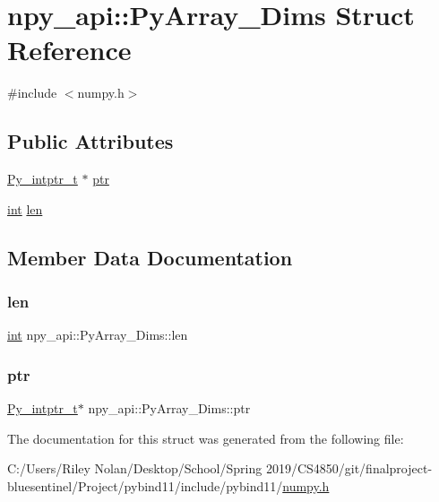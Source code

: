 \hypertarget{structnpy__api_1_1_py_array___dims}{}\section{npy\+\_\+api\+::Py\+Array\+\_\+\+Dims Struct Reference}
\label{structnpy__api_1_1_py_array___dims}


{\ttfamily \#include $<$numpy.\+h$>$}

\subsection*{Public Attributes}
\begin{DoxyCompactItemize}
\item 
\mbox{\hyperlink{pyport_8h_abd3f9942a9af5f7423b51d51992df0ac}{Py\+\_\+intptr\+\_\+t}} $\ast$ \mbox{\hyperlink{structnpy__api_1_1_py_array___dims_a92da178f75f6195573be943e4ae19aba}{ptr}}
\item 
\mbox{\hyperlink{warnings_8h_a74f207b5aa4ba51c3a2ad59b219a423b}{int}} \mbox{\hyperlink{structnpy__api_1_1_py_array___dims_a5ac8498e3a21e91b70c1e4740247e7ff}{len}}
\end{DoxyCompactItemize}


\subsection{Member Data Documentation}
\mbox{\label{structnpy__api_1_1_py_array___dims_a5ac8498e3a21e91b70c1e4740247e7ff}} 
\subsubsection{\texorpdfstring{len}{len}}
{\footnotesize\ttfamily \mbox{\hyperlink{warnings_8h_a74f207b5aa4ba51c3a2ad59b219a423b}{int}} npy\+\_\+api\+::\+Py\+Array\+\_\+\+Dims\+::len}

\mbox{\label{structnpy__api_1_1_py_array___dims_a92da178f75f6195573be943e4ae19aba}} 
\subsubsection{\texorpdfstring{ptr}{ptr}}
{\footnotesize\ttfamily \mbox{\hyperlink{pyport_8h_abd3f9942a9af5f7423b51d51992df0ac}{Py\+\_\+intptr\+\_\+t}}$\ast$ npy\+\_\+api\+::\+Py\+Array\+\_\+\+Dims\+::ptr}



The documentation for this struct was generated from the following file\+:\begin{DoxyCompactItemize}
\item 
C\+:/\+Users/\+Riley Nolan/\+Desktop/\+School/\+Spring 2019/\+C\+S4850/git/finalproject-\/bluesentinel/\+Project/pybind11/include/pybind11/\mbox{\hyperlink{numpy_8h}{numpy.\+h}}\end{DoxyCompactItemize}
